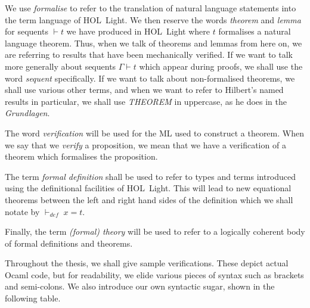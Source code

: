 We use \emph{formalise} to refer to the translation of natural language statements into the term language of HOL~Light. We then reserve the words \emph{theorem} and \emph{lemma} for sequents $\vdash t$ we have produced in HOL~Light where $t$ formalises a natural language theorem. Thus, when we talk of theorems and lemmas from here on, we are referring to results that have been mechanically verified. If we want to talk more generally about sequents $\Gamma\vdash t$ which appear during proofs, we shall use the word \emph{sequent} specifically. If we want to talk about non-formalised theorems, we shall use various other terms, and when we want to refer to Hilbert's named results in particular, we shall use \emph{THEOREM} in uppercase, as he does in the \emph{Grundlagen}. 

The word \emph{verification}  will be used for the ML used to construct a theorem. When we say that we \emph{verify} a proposition, we mean that we have a verification of a theorem which formalises the proposition. 

The term \emph{formal definition} shall be used to refer to types and terms introduced using the definitional facilities of HOL~Light. This will lead to new equational theorems between the left and right hand sides of the definition which we shall notate by $\vdash_{def}\; x = t$. 

Finally, the term \emph{(formal) theory} will be used to refer to a logically coherent body of formal definitions and theorems.

Throughout the thesis, we shall give sample verifications. These depict actual Ocaml code, but for readability, we elide various pieces of syntax such as brackets and semi-colons. We also introduce our own syntactic sugar, shown in the following table.


